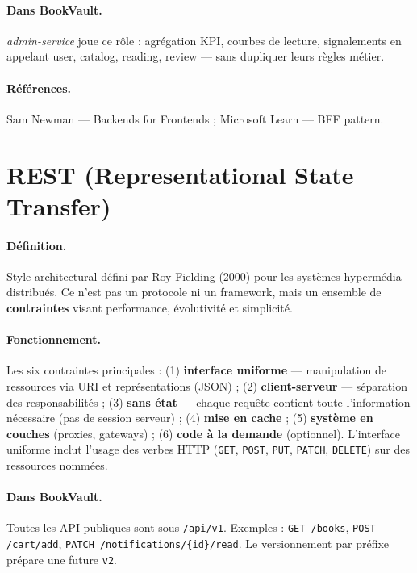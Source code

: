 \documentclass[12pt,a4paper]{report}
\begin{document}
\paragraph{Dans BookVault.} \textit{admin-service} joue ce rôle : agrégation KPI, courbes de lecture, signalements en appelant user, catalog, reading, review — sans dupliquer leurs règles métier.\par

\paragraph{Références.} Sam Newman — Backends for Frontends ; Microsoft Learn — BFF pattern.\par


\section{REST (Representational State Transfer)}

\paragraph{Définition.} Style architectural défini par Roy Fielding (2000) pour les systèmes hypermédia distribués. Ce n'est pas un protocole ni un framework, mais un ensemble de \textbf{contraintes} visant performance, évolutivité et simplicité.\par

\paragraph{Fonctionnement.} Les six contraintes principales : (1) \textbf{interface uniforme} — manipulation de ressources via URI et représentations (JSON) ; (2) \textbf{client-serveur} — séparation des responsabilités ; (3) \textbf{sans état} — chaque requête contient toute l'information nécessaire (pas de session serveur) ; (4) \textbf{mise en cache} ; (5) \textbf{système en couches} (proxies, gateways) ; (6) \textbf{code à la demande} (optionnel). L'interface uniforme inclut l'usage des verbes HTTP (\texttt{GET}, \texttt{POST}, \texttt{PUT}, \texttt{PATCH}, \texttt{DELETE}) sur des ressources nommées.\par

\paragraph{Dans BookVault.} Toutes les API publiques sont sous \texttt{/api/v1}. Exemples : \texttt{GET /books}, \texttt{POST /cart/add}, \texttt{PATCH /notifications/\{id\}/read}. Le versionnement par préfixe prépare une future \texttt{v2}.\par
\end{document}

